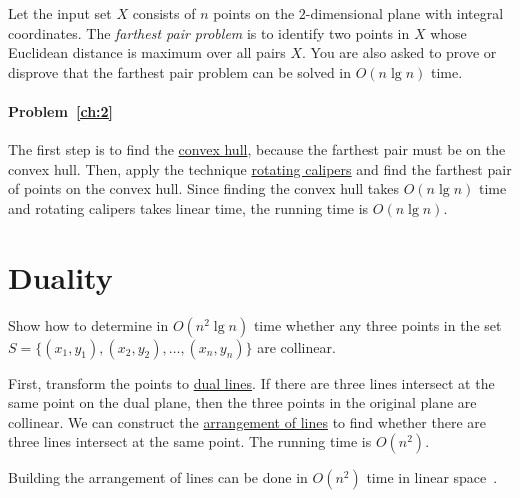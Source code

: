 \begin{Exercise}[title={Farthest pair},origin={NTU CSIE 97}]
Let the input set $X$ consists of $n$ points on the $2$-dimensional plane with integral coordinates. The \emph{farthest pair problem} is to identify two points in $X$ whose Euclidean distance is maximum over all pairs $X$. You are also asked to prove or disprove that the farthest pair problem can be solved in $O(n \lg n)$ time. \label{ch:2}  
\end{Exercise}
\begin{Answer}
\paragraph{Problem~\ref{ch:2}}
The first step is to find the \href{https://en.wikipedia.org/wiki/Convex_hull_algorithms}{convex hull}, because the farthest pair must be on the convex hull. Then, apply the technique \href{https://en.wikipedia.org/wiki/Rotating_calipers}{rotating calipers} and find the farthest pair of points on the convex hull. Since finding the convex hull takes $O(n \lg n)$ time and rotating calipers takes linear time, the running time is $O(n \lg n)$.
\end{Answer}

\section{Duality}
\begin{Exercise}
Show how to determine in $O(n^2 \lg n)$ time whether any three points in the set $S = \{(x_1, y_1), (x_2, y_2), \dots, (x_n, y_n)\}$ are collinear. 
\end{Exercise}
\begin{Answer}
First, transform the points to \href{https://en.wikipedia.org/wiki/Duality_(projective_geometry)}{dual lines}. If there are three lines intersect at the same point on the dual plane, then the three points in the original plane are collinear. We can construct the \href{https://en.wikipedia.org/wiki/Arrangement_of_lines}{arrangement of lines} to find whether there are three lines intersect at the same point. The running time is $O(n^2)$.
\begin{remark}
Building the arrangement of lines can be done in $O(n^2)$ time in linear space~\cite{Edelsbrunner1989}.
\end{remark}
\end{Answer}

